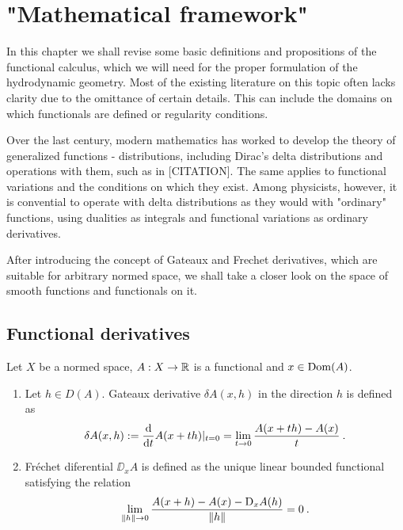 \chapter{"Mathematical framework"}

In this chapter we shall revise some basic definitions and propositions of the functional calculus, which we will need for the proper formulation of the hydrodynamic geometry. Most of the existing literature on this topic often lacks clarity due to the omittance of certain details. This can include the domains on which functionals are defined or regularity conditions.

Over the last century, modern mathematics has worked to develop the theory of generalized functions - distributions, including Dirac's delta distributions and operations with them, such as in [CITATION]. The same applies to functional variations and the conditions on which they exist. 
Among physicists, however, it is convential to operate with delta distributions as they would with "ordinary" functions, using dualities as integrals and functional variations as ordinary derivatives.


After introducing the concept of Gateaux and Frechet derivatives, which are suitable for arbitrary normed space, we shall take a closer look on the space of smooth functions and functionals on it.

\section{Functional derivatives}


\begin{definition}
    Let $X$ be a normed space, $A: X \to \mathbb{R}$ is a functional and $x \in \mathrm{Dom}(A)$.
    \begin{enumerate}
        \item Let $h \in D(A)$. Gateaux derivative $\delta A(x,h)$ in the direction $h$ is defined as
        \begin{align}
            \delta A (x,h) := \frac{\mathrm{d}}{\mathrm{d}t} A(x+th) |_{t=0} = \lim_{t \rightarrow 0} \frac{A(x+th)-A(x)}{t} \:.
        \end{align}

        \item Fréchet diferential $\DD_x A$ is defined as the unique linear bounded functional satisfying the relation
        \begin{align}
            \lim_{\left \Vert h \right \Vert \rightarrow 0} \frac{A(x+h)-A(x)- \mathrm{D}_x A(h)}{\left \Vert h \right \Vert} = 0 \:.
        \end{align}
    \end{enumerate}
\end{definition}

